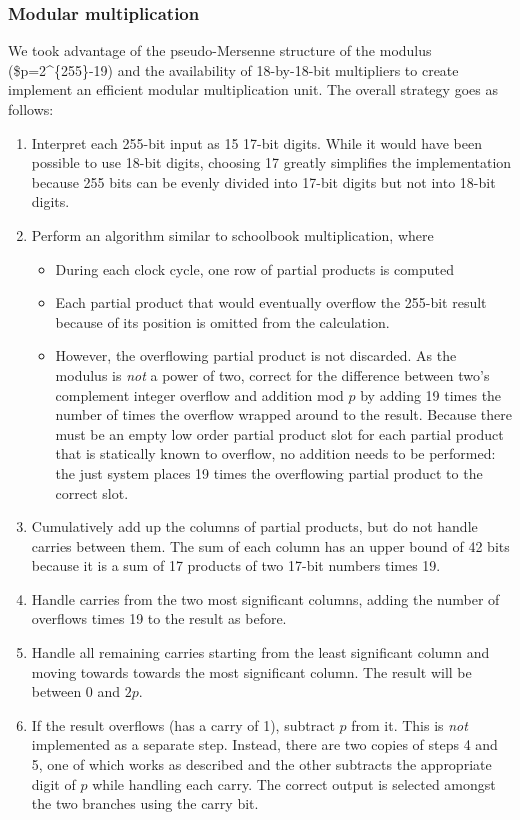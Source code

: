 \subsubsection{Modular multiplication}\label{modular-multiplication}

We took advantage of the pseudo-Mersenne structure of the modulus
(\$p=2\^{}\{255\}-19) and the availability of 18-by-18-bit multipliers
to create implement an efficient modular multiplication unit. The
overall strategy goes as follows:

\begin{enumerate}
\def\labelenumi{\arabic{enumi}.}
\itemsep1pt\parskip0pt
\item
  Interpret each 255-bit input as 15 17-bit digits. While it would have
  been possible to use 18-bit digits, choosing 17 greatly simplifies the
  implementation because 255 bits can be evenly divided into 17-bit
  digits but not into 18-bit digits.
\item
  Perform an algorithm similar to schoolbook multiplication, where

  \begin{itemize}
  \itemsep1pt\parskip0pt
  \item
    During each clock cycle, one row of partial products is computed
  \item
    Each partial product that would eventually overflow the 255-bit
    result because of its position is omitted from the calculation.
  \item
    However, the overflowing partial product is not discarded. As the
    modulus is \emph{not} a power of two, correct for the difference
    between two's complement integer overflow and addition mod \(p\) by
    adding 19 times the number of times the overflow wrapped around to
    the result. Because there must be an empty low order partial product
    slot for each partial product that is statically known to overflow,
    no addition needs to be performed: the just system places 19 times
    the overflowing partial product to the correct slot.
  \end{itemize}
\item
  Cumulatively add up the columns of partial products, but do not handle
  carries between them. The sum of each column has an upper bound of 42
  bits because it is a sum of 17 products of two 17-bit numbers times
  19.
\item
  Handle carries from the two most significant columns, adding the
  number of overflows times 19 to the result as before.
\item
  Handle all remaining carries starting from the least significant
  column and moving towards towards the most significant column. The
  result will be between \(0\) and \(2p\).
\item
  If the result overflows (has a carry of 1), subtract \(p\) from it.
  This is \emph{not} implemented as a separate step. Instead, there are
  two copies of steps 4 and 5, one of which works as described and the
  other subtracts the appropriate digit of \(p\) while handling each
  carry. The correct output is selected amongst the two branches using
  the carry bit.
\end{enumerate}

